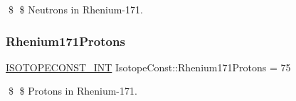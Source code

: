 \$ \$ Neutrons in Rhenium-\/171. \mbox{\label{group___isotope_const-_rhenium-_re171_ga534677f833bc3363e4fc59b4029950c2}} 
\subsubsection{\texorpdfstring{Rhenium171\+Protons}{Rhenium171Protons}}
{\footnotesize\ttfamily \mbox{\hyperlink{group___isotope_const-_macros_ga5f18360b3e99483a35c32d789e62621c}{I\+S\+O\+T\+O\+P\+E\+C\+O\+N\+S\+T\+\_\+\+I\+NT}} Isotope\+Const\+::\+Rhenium171\+Protons = 75}

\$ \$ Protons in Rhenium-\/171. 